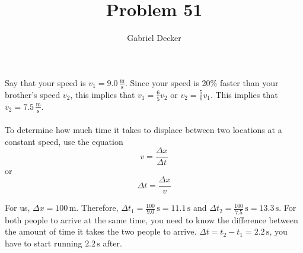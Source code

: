 \documentclass[12pt]{article}
\title{Problem 51}
\author{Gabriel Decker}
\newcommand{\unitSpeed}{\frac{\text{m}}{\text{s}}}
\begin{document}
\maketitle
\begin{flushleft}

Say that your speed is $v_1=9.0\,\unitSpeed$. Since your speed is 20\% faster than your brother's speed $v_2$, this implies that $v_1=\frac{6}{5}v_2$ or $v_2=\frac{5}{6}v_1$.
This implies that $v_2=7.5\,\unitSpeed$.\\~\\

To determine how much time it takes to displace between two locations at a constant speed, use the equation
$$v=\frac{\Delta x}{\Delta t}$$
or
$$\Delta t=\frac{\Delta x}{v}$$

For us, $\Delta x=100\,\text{m}$.
Therefore, $\Delta t_1=\frac{100}{9.0}\,\text{s}=11.1\,\text{s}$ and $\Delta t_2=\frac{100}{7.5}\,\text{s}=13.3\,\text{s}$.
For both people to arrive at the same time, you need to know the difference between the amount of time it takes the two people to arrive.
$\Delta t=t_2-t_1=2.2\,\text{s}$, you have to start running $2.2\,\text{s}$ after.




\end{flushleft}
\end{document}

